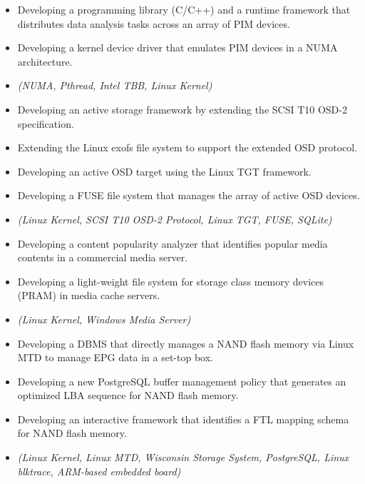 \begin{itemize}
    \item {Developing a programming library (C/C++) and a runtime framework
        that distributes data analysis tasks across an array of PIM devices.}
    \item {Developing a kernel device driver that emulates PIM devices in a NUMA architecture.}
    \item {\it\small(NUMA, Pthread, Intel TBB, Linux Kernel)}
\end{itemize}

\begin{itemize}
    \item {Developing an active storage framework by extending the SCSI T10 OSD-2
        specification.}
    \item {Extending the Linux exofs file system to support the extended OSD protocol.}
    \item {Developing an active OSD target using the Linux TGT framework.}
    \item {Developing a FUSE file system that manages the array of active OSD devices.}
    \item {\it\small(Linux Kernel, SCSI T10 OSD-2 Protocol, Linux TGT, FUSE, SQLite)}
\end{itemize}

\begin{itemize}
    \item {Developing a content popularity analyzer that identifies
        popular media contents in a commercial media server.}
    \item{Developing a light-weight file system for storage class memory devices (PRAM) in media cache servers.}
    \item{\it\small(Linux Kernel, Windows Media Server)}
\end{itemize}

\begin{itemize}
    \item{Developing a DBMS that directly manages a NAND flash memory
        via Linux MTD to manage EPG data in a set-top box.}
    \item{Developing a new PostgreSQL buffer management policy
        that generates an optimized LBA sequence for NAND flash memory.}
    \item{Developing an interactive framework that
        identifies a FTL mapping schema for NAND flash memory.}
    \item{\it\small(Linux Kernel, Linux MTD, Wisconsin Storage System, PostgreSQL,
        Linux blktrace, ARM-based embedded board)}
\end{itemize}

